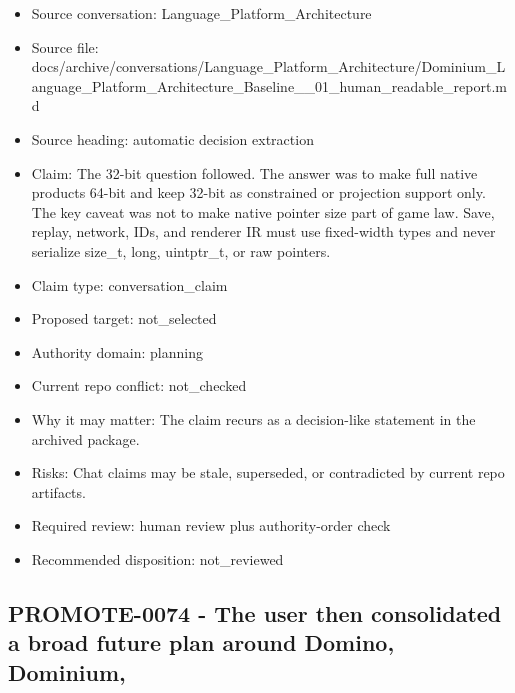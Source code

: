 \documentclass[11pt,a4paper]{report}
\begin{document}
\begin{itemize}
\item Source conversation: Language\_Platform\_Architecture
\item Source file: docs/archive/conversations/Language\_Platform\_Architecture/Dominium\_Language\_Platform\_Architecture\_Baseline\_\_01\_human\_readable\_report.md
\item Source heading: automatic decision extraction
\item Claim: The 32-bit question followed. The answer was to make full native products 64-bit and keep 32-bit as constrained or projection support only. The key caveat was not to make native pointer size part of game law. Save, replay, network, IDs, and renderer IR must use fixed-width types and never serialize size\_t, long, uintptr\_t, or raw pointers.
\item Claim type: conversation\_claim
\item Proposed target: not\_selected
\item Authority domain: planning
\item Current repo conflict: not\_checked
\item Why it may matter: The claim recurs as a decision-like statement in the archived package.
\item Risks: Chat claims may be stale, superseded, or contradicted by current repo artifacts.
\item Required review: human review plus authority-order check
\item Recommended disposition: not\_reviewed
\end{itemize}

\subsection{PROMOTE-0074 - The user then consolidated a broad future plan around Domino, Dominium,}
\end{document}
